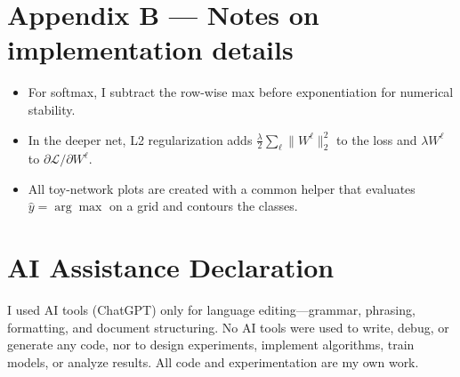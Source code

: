 \documentclass[11pt]{article}
\begin{document}
\section*{Appendix B --- Notes on implementation details}
\begin{itemize}[leftmargin=1.2em]
  \item For softmax, I subtract the row-wise max before exponentiation for numerical stability.
  \item In the deeper net, L2 regularization adds \( \frac{\lambda}{2}\sum_\ell \|W^\ell\|_2^2 \) to the loss and \( \lambda W^\ell \) to \( \partial \mathcal{L}/\partial W^\ell \).
  \item All toy-network plots are created with a common helper that evaluates \(\hat{y}=\arg\max\) on a grid and contours the classes.
\end{itemize}

\small

\section*{AI Assistance Declaration}
\noindent I used AI tools (ChatGPT) only for language editing—grammar, phrasing, formatting, and document structuring. No AI tools were used to write, debug, or generate any code, nor to design experiments, implement algorithms, train models, or analyze results. All code and experimentation are my own work.

\normalsize
\end{document}
